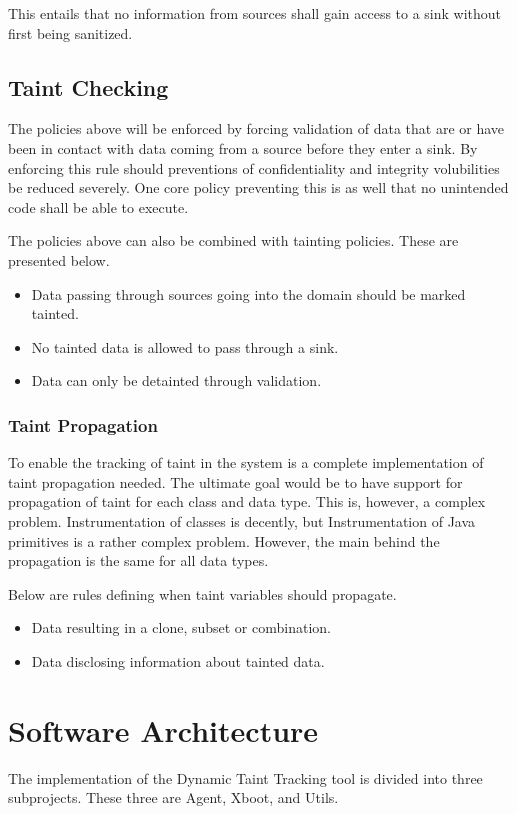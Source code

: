 This entails that no information from sources shall gain access to a sink without first being sanitized.


\subsection{Taint Checking}
The policies above will be enforced by forcing validation of data that are or have been in contact with data coming from a source before they enter a sink. By enforcing this rule should preventions of confidentiality and integrity volubilities be reduced severely. One core policy preventing this is as well that no unintended code shall be able to execute.

The policies above can also be combined with tainting policies. These are presented below.

\hfill
\begin{itemize}
    \item Data passing through sources going into the domain should be marked tainted.
    \item No tainted data is allowed to pass through a sink.
    \item Data can only be detainted through validation.
\end{itemize}
\hfill


\subsubsection{Taint Propagation}
To enable the tracking of taint in the system is a complete implementation of taint propagation needed. The ultimate goal would be to have support for propagation of taint for each class and data type. This is, however, a complex problem. Instrumentation of classes is decently, but Instrumentation of Java primitives is a rather complex problem. However, the main behind the propagation is the same for all data types. 

Below are rules defining when taint variables should propagate.

\hfill
\begin{itemize}
    \item Data resulting in a clone, subset or combination.
    \item Data disclosing information about tainted data.
\end{itemize}
\hfill


\section{Software Architecture}
\label{SoftwareArchitecture}
The implementation of the Dynamic Taint Tracking tool is divided into three subprojects. These three are Agent, Xboot, and Utils. 

